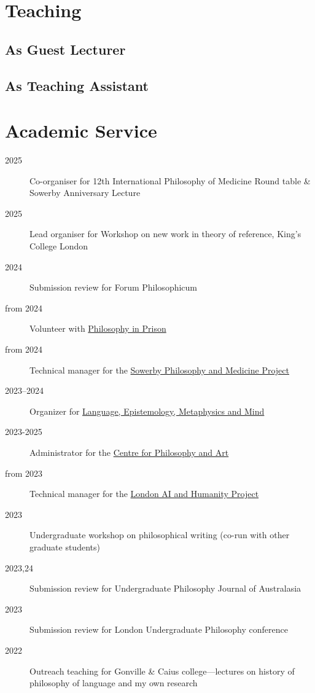 \documentclass{cv}
\begin{document}
\section*{Teaching}
\subsection*{As Guest Lecturer}
\printbibliography[env=teaching,check=Teaching+GuestLecturer]{}

\subsection*{As Teaching Assistant}
\printbibliography[env=teaching,check=Teaching+TA]{}

\section*{Academic Service}
\begin{description}
\item[{2025}] Co-organiser for 12th International Philosophy of
Medicine Round table \& Sowerby Anniversary Lecture
\item[{2025}] Lead organiser for Workshop on new work in theory of reference, King's College London
\item[{2024}] Submission review for Forum Philosophicum
\item[{from 2024}] Volunteer with \href{https://www.philosophyinprison.com/}{Philosophy in Prison}
\item[{from 2024}] Technical manager for the \href{https://www.philosophyandmedicine.org/}{Sowerby Philosophy and
Medicine Project}
\item[{2023--2024}] Organizer for \href{https://www.lemm-london.co.uk/}{Language, Epistemology, Metaphysics and Mind}
\item[{2023-2025}] Administrator for the \href{https://philosophyarts.co.uk/}{Centre for Philosophy and Art}
\item[{from 2023}] Technical manager for the \href{https://www.ai-humanity-london.com/}{London AI and Humanity Project}
\item[{2023}] Undergraduate workshop on philosophical writing (co-run with other graduate students)
\item[{2023,24}] Submission review for Undergraduate Philosophy
  Journal of Australasia
\item[{2023}] Submission review for London Undergraduate Philosophy
conference
\item[{2022}] Outreach teaching for Gonville \& Caius college---lectures on
history of philosophy of language and my own research
\end{description}
\end{document}

